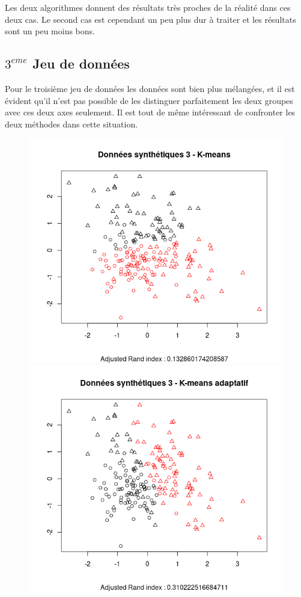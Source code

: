 \documentclass[a4paper, titlepage]{report}
\begin{document}
Les deux algorithmes donnent des résultats très proches de la réalité dans ces deux cas. Le second cas est cependant un peu plus dur à traiter et les résultats sont un peu moins bons.


\subsection*{$3^{eme}$ Jeu de données}

Pour le troisième jeu de données les données sont bien plus mélangées, et il est évident qu'il n'est pas possible de les distinguer parfaitement les deux groupes avec ces deux axes seulement. Il est tout de même intéressant de confronter les deux méthodes dans cette situation.

\begin{figure}[h]
	\begin{center}
		\includegraphics[scale = 0.35]{./doc/synt-3-k.png}
		\includegraphics[scale = 0.35]{./doc/synt-3-ka.png}
	\end{center}
\end{figure}
\end{document}
